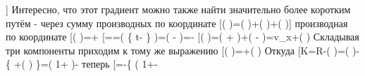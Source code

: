 \documentclass[11pt]{article}
\begin{document}
{]} Интересно, что этот градиент можно также найти значительно более
коротким путём - через сумму производных по координате {[}\nabla \left(
\cdot {}
\right)=\left(
\cdot {}
\right)+\left(
\cdot {}
\right)+\left(
\cdot {} \right){]} производная по
координате {[}\left(
\cdot {}
\right)=+\frac{\partial \overrightarrow{v}}{\partial x}{]}
{[}==\left(
\left\{ t- \right\}
\right)=\left(
-
\right)=-\frac{{{R}_{x}}}{K}{]}
{[}\left(
\cdot {}
\right)=\left(
+
\right)+\left(
-
\right)={{v}\_{x}}+\left(
\right)\frac{{{R}_{x}}}{K}{]} Складывая три компоненты приходим к тому
же выражению {[}\nabla \left( \cdot {}
\right)=+\left(
\right)\frac{\overrightarrow{R}}{K}{]} Откуда
{[}\nabla K=\nabla R-\nabla \left(
\cdot {} \right)=\left(
 \right)-\left\{
+\left(
\right)
\right\}=\left(
1+
\right)-\frac{\overrightarrow{v}}{c}{]} теперь
{[}\nabla {}=-\left\{
\left(
1+-
\end{document}
